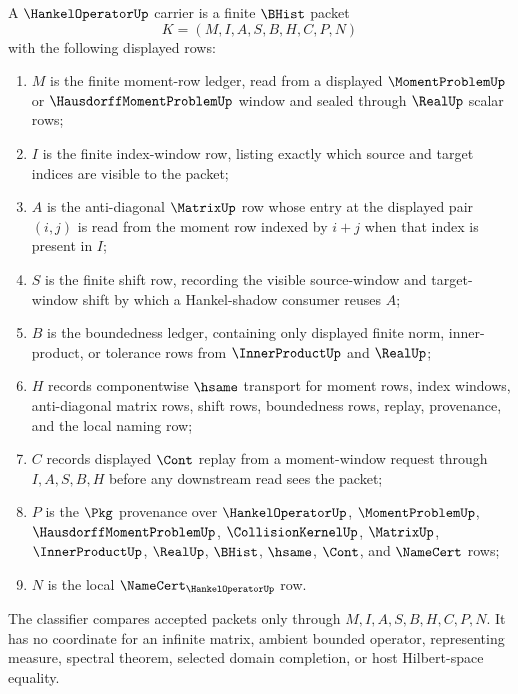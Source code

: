 \begin{definition}
\label{def:hankel-operator-carrier}
A $\HankelOperatorUp$ carrier is a finite $\BHist$ packet
$$
K=(M,I,A,S,B,H,C,P,N)
$$
with the following displayed rows:
\begin{enumerate}
\item $M$ is the finite moment-row ledger, read from a displayed $\MomentProblemUp$ or $\HausdorffMomentProblemUp$ window and sealed through $\RealUp$ scalar rows;
\item $I$ is the finite index-window row, listing exactly which source and target indices are visible to the packet;
\item $A$ is the anti-diagonal $\MatrixUp$ row whose entry at the displayed pair $(i,j)$ is read from the moment row indexed by $i+j$ when that index is present in $I$;
\item $S$ is the finite shift row, recording the visible source-window and target-window shift by which a Hankel-shadow consumer reuses $A$;
\item $B$ is the boundedness ledger, containing only displayed finite norm, inner-product, or tolerance rows from $\InnerProductUp$ and $\RealUp$;
\item $H$ records componentwise $\hsame$ transport for moment rows, index windows, anti-diagonal matrix rows, shift rows, boundedness rows, replay, provenance, and the local naming row;
\item $C$ records displayed $\Cont$ replay from a moment-window request through $I,A,S,B,H$ before any downstream read sees the packet;
\item $P$ is the $\Pkg$ provenance over $\HankelOperatorUp$, $\MomentProblemUp$, $\HausdorffMomentProblemUp$, $\CollisionKernelUp$, $\MatrixUp$, $\InnerProductUp$, $\RealUp$, $\BHist$, $\hsame$, $\Cont$, and $\NameCert$ rows;
\item $N$ is the local $\NameCert_{\HankelOperatorUp}$ row.
\end{enumerate}
The classifier compares accepted packets only through $M,I,A,S,B,H,C,P,N$. It has no coordinate for an infinite matrix, ambient bounded operator, representing measure, spectral theorem, selected domain completion, or host Hilbert-space equality.
\end{definition}

